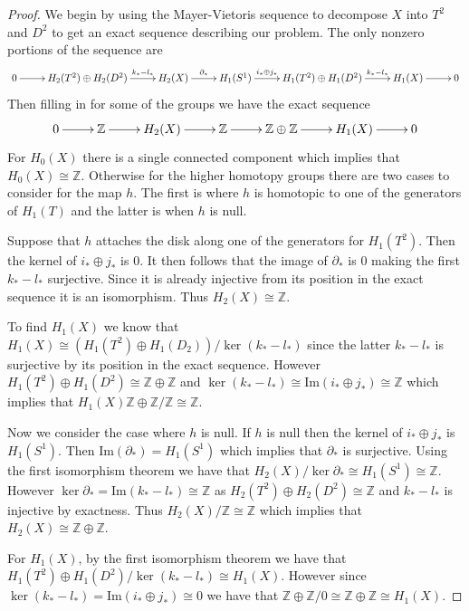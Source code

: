 \documentclass[10pt]{article}
\newcommand{\bb}[1]{\mathbb{#1}}
\theoremstyle{plain}
\theoremstyle{remark}
\begin{document}
\begin{proof}
  We begin by using the Mayer-Vietoris sequence to decompose $X$ into $T^2$ and $D^2$
  to get an exact sequence describing our problem. The only nonzero portions of
  the sequence are
  \[
    \xymatrix{
      0 \ar[r] & H_2(T^2)\oplus H_2(D^2) \ar[r]^-{k_*-l_*} & H_2(X) \ar[r]^-{\partial_*} &
      H_1(S^1) \ar[r]^-{i_*\oplus j_*} & H_1(T^2)\oplus H_1(D^2) \ar[r]^-{k_*-l_*} & H_1(X) \ar[r] & 0\\
    }
  \]
  Then filling in for some of the groups we have the exact sequence
  \[
    \xymatrix{
      0 \ar[r] & \bb{Z} \ar[r] & H_2(X) \ar[r] & \bb{Z} \ar[r]
      &\bb{Z}\oplus\bb{Z}\ar[r] & H_1(X)\ar[r] & 0
    }
  \]
  For $H_0(X)$ there is a single connected component which implies that
  $H_0(X)\cong \bb{Z}$. Otherwise for the higher homotopy groups there are two
  cases to consider for the map $h$. The first is where $h$
  is homotopic to one of the generators of $H_1(T)$ and the latter is when $h$
  is null.

  Suppose that $h$ attaches the disk along one of the generators for $H_1(T^2)$.
  Then the kernel of $i_*\oplus j_*$ is $0$. It then follows that the image of
  $\partial_*$ is $0$ making the first $k_*-l_*$ surjective. Since it is already
  injective from its position in the exact sequence it is an isomorphism.
  Thus $H_2(X)\cong\bb{Z}$.

  To find $H_1(X)$ we know that $H_1(X)\cong (H_1(T^2)\oplus H_1(D_2))/\ker(k_*-l_*)$ since
  the latter $k_*-l_*$ is surjective by its position in the exact sequence.
  However $H_1(T^2)\oplus H_1(D^2)\cong\bb{Z}\oplus\bb{Z}$ and
  $\ker(k_*-l_*)\cong \mathrm{Im}(i_*\oplus j_*)\cong \bb{Z}$ which implies that
  $H_1(X)\bb{Z}\oplus\bb{Z}/\bb{Z}\cong\bb{Z}$.

  Now we consider the case where $h$ is null. If $h$ is null then the kernel
  of $i_*\oplus j_*$ is $H_1(S^1)$. Then $\mathrm{Im}(\partial_*)=H_1(S^1)$ which implies that
  $\partial_*$ is surjective. Using the first isomorphism theorem we have that
  $H_2(X)/\ker \partial_* \cong H_1(S^1)\cong \bb{Z}$. However $\ker\partial_*=\mathrm{Im}(k_*-l_*)\cong \bb{Z}$
  as $H_2(T^2)\oplus H_2(D^2)\cong \bb{Z}$ and $k_*-l_*$ is injective by exactness. Thus
  $H_2(X)/\bb{Z}\cong\bb{Z}$ which implies that $H_2(X)\cong \bb{Z}\oplus\bb{Z}$.

  For $H_1(X)$, by the first isomorphism theorem we have that
  $H_1(T^2)\oplus H_1(D^2)/\ker(k_*-l_*)\cong H_1(X)$. However since
  $\ker(k_*-l_*)=\mathrm{Im}(i_*\oplus j_*)\cong 0$ we have that
  $\bb{Z}\oplus\bb{Z}/0\cong \bb{Z}\oplus\bb{Z}\cong H_1(X)$.


\end{proof}
\end{document}
